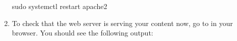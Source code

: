 \documentclass[a4paper,10pt,english,openany,oneside]{sphinxmanual}
\begin{document}
\begin{enumerate}
\begin{sphinxVerbatim}[commandchars=\\\{\}]
\PYGZdl{} sudo systemctl restart apache2
\end{sphinxVerbatim}

\item {} 
\sphinxAtStartPar
To check that the web server is serving your content now, go to  in your browser. You should see the following output:
\begin{quote}

\sphinxAtStartPar
{}
\end{quote}

\end{enumerate}
\end{document}
